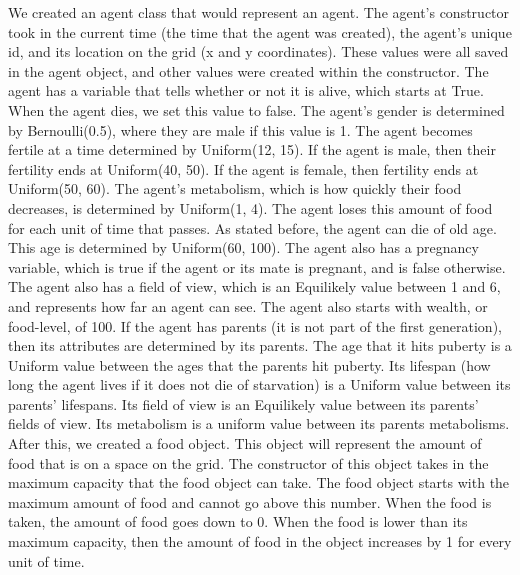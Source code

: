 \documentclass[11pt]{article}
\begin{document}
\begin{multicols}{2}
We created an agent class that would represent an agent. The agent's constructor took in the current time (the time that the agent was created), the agent's unique id, and its location on the grid (x and y coordinates). These values were all saved in the agent object, and other values were created within the constructor. The agent has a variable that tells whether or not it is alive, which starts at True. When the agent dies, we set this value to false. The agent's gender is determined by Bernoulli(0.5), where they are male if this value is 1. The agent becomes fertile at a time determined by Uniform(12, 15). If the agent is male, then their fertility ends at Uniform(40, 50). If the agent is female, then fertility ends at Uniform(50, 60). The agent's metabolism, which is how quickly their food decreases, is determined by Uniform(1, 4). The agent loses this amount of food for each unit of time that passes. As stated before, the agent can die of old age. This age is determined by Uniform(60, 100). The agent also has a pregnancy variable, which is true if the agent or its mate is pregnant, and is false otherwise. The agent also has a field of view, which is an Equilikely value between 1 and 6, and represents how far an agent can see.
The agent also starts with wealth, or food-level, of 100.
\newline
If the agent has parents (it is not part of the first generation), then its attributes are determined by its parents. The age that it hits puberty is a Uniform value between the ages that the parents hit puberty. Its lifespan (how long the agent lives if it does not die of starvation) is a Uniform value between its parents' lifespans. Its field of view is an Equilikely value between its parents' fields of view. Its metabolism is a uniform value between its parents metabolisms.
\newline
\newline
After this, we created a food object. This object will represent the amount of food that is on a space on the grid. The constructor of this object takes in the maximum capacity that the food object can take. The food object starts with the maximum amount of food and cannot go above this number. When the food is taken, the amount of food goes down to 0. When the food is lower than its maximum capacity, then the amount of food in the object increases by 1 for every unit of time.
\newline
\newline

\end{multicols}
\end{document}
